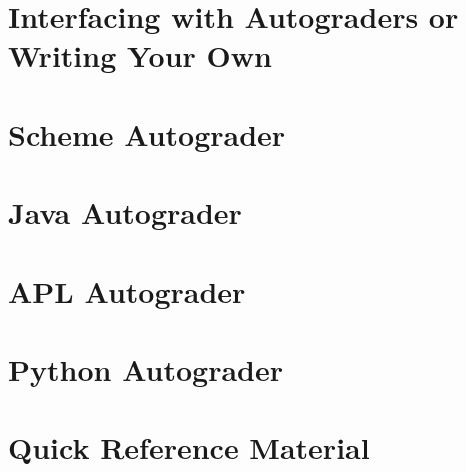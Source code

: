 \chapter{Interfacing with Autograders or Writing Your Own}



\chapter{Scheme Autograder}

\chapter{Java Autograder}

\chapter{APL Autograder}

\chapter{Python Autograder}

\chapter{Quick Reference Material}

\bye
